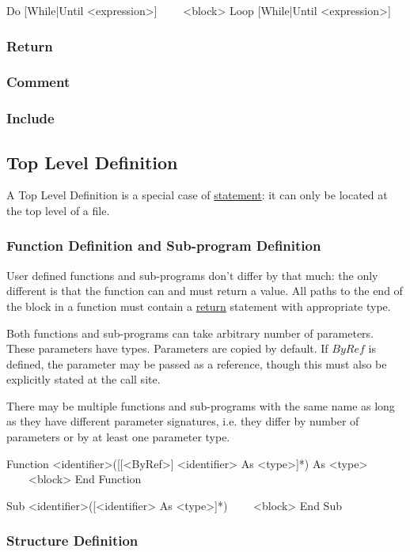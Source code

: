 \begin{grammar}
Do [While|Until <expression>]
~~~~<block>
Loop [While|Until <expression>]
\end{grammar}

\subsubsection{Return}
\label{stat:return}

\subsubsection{Comment}
\label{stat:comment}

\subsubsection{Include}
\label{stat:include}


\subsection{Top Level Definition}
\label{tld}
A Top Level Definition is a special case of \hyperref[statement]{statement}:
it can only be located at the top level of a file.

\subsubsection{Function Definition and Sub-program Definition}
\label{tld:funcdef}
User defined functions and sub-programs don't differ by that much:
the only different is that the function can and must return a value.
All paths to the end of the block in a function must contain a \hyperref[stat:return]{return} statement
with appropriate type.

Both functions and sub-programs can take arbitrary number of parameters.
These parameters have types.
Parameters are copied by default.
If $ByRef$ is defined, the parameter may be passed as a reference,
though this must also be explicitly stated at the call site.

There may be multiple functions and sub-programs with the same name
as long as they have different parameter signatures, i.e.
they differ by number of parameters or by at least one parameter type.

\begin{grammar}
Function <identifier>([[<ByRef>] <identifier> As <type>]*) As <type>
~~~~<block>
End Function

Sub <identifier>([<identifier> As <type>]*)
~~~~<block>
End Sub
\end{grammar}


\subsubsection{Structure Definition}
\label{tld:structdef}
